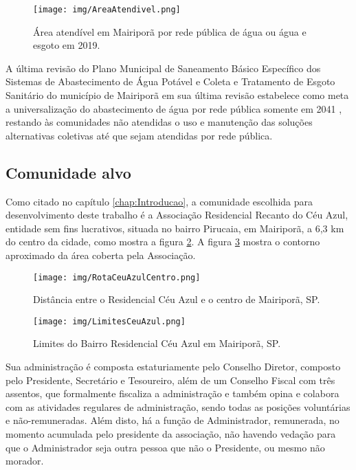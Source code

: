 \begin{figure}[htbp!]
    \centering
    \suppressfloats[t]
    \texttt{[image: img/AreaAtendivel.png]}
    \caption{Área atendível em Mairiporã por rede pública de água ou água e esgoto em 2019.}
    \label{fig:AreaAtendivel}
\end{figure}

A última revisão do Plano Municipal de Saneamento Básico Específico dos Sistemas de Abastecimento de Água Potável e Coleta e Tratamento de Esgoto Sanitário do município de Mairiporã em sua última revisão estabelece como meta a universalização do abastecimento de água por rede pública somente em 2041 \cite{RelSinteseMairipora2022}, restando às comunidades não atendidas o uso e manutenção das soluções alternativas coletivas até que sejam atendidas por rede pública.

\subsection{Comunidade alvo}\label{comunidade}
Como citado no capítulo \ref{chap:Introducao}, a comunidade escolhida para desenvolvimento deste trabalho é a Associação Residencial Recanto do Céu Azul, entidade sem fins lucrativos, situada no bairro Pirucaia, em Mairiporã, a 6,3 km do centro da cidade, como mostra a figura \ref{fig:locCeuAzul}. A figura \ref{fig:limitesCeuAzul} mostra o contorno aproximado da área coberta pela Associação.

\begin{figure}[htbp!]
    \centering
    \suppressfloats[t]
    \texttt{[image: img/RotaCeuAzulCentro.png]}
    \caption{Distância entre o Residencial Céu Azul e o centro de Mairiporã, SP.}
    \label{fig:locCeuAzul}
\end{figure}

\begin{figure}[htbp!]
    \centering
    \suppressfloats[t]
    \texttt{[image: img/LimitesCeuAzul.png]}
    \caption{Limites do Bairro Residencial Céu Azul em Mairiporã, SP.}
    \label{fig:limitesCeuAzul}
\end{figure}

Sua administração é composta estaturiamente pelo Conselho Diretor, composto pelo Presidente, Secretário e Tesoureiro, além de um Conselho Fiscal com três assentos, que formalmente fiscaliza a administração e também opina e colabora com as atividades regulares de administração, sendo todas as posições voluntárias e não-remuneradas. Além disto, há a função de Administrador, remunerada, no momento acumulada pelo presidente da associação, não havendo vedação para que o Administrador seja outra pessoa que não o Presidente, ou mesmo não morador. 

